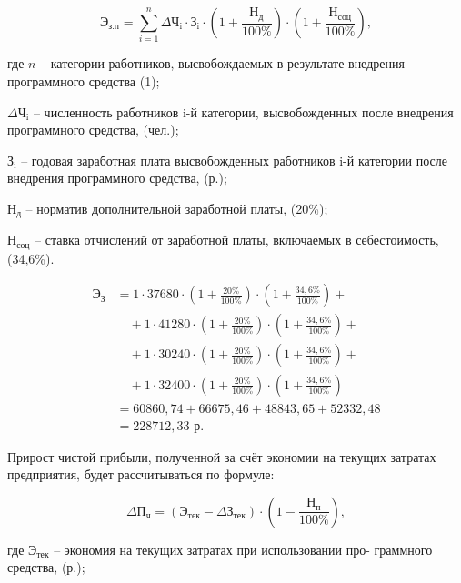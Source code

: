 \begin{equation}
    \text{Э}_{\text{з.п}} = \sum_{i=1}^{n}{\text{$\Delta$Ч}_{\text{i}}\cdot \text{З}_{\text{i}}\cdot  (1+\frac{\text{Н}_{\text{д}}}{100\%})\cdot (1+\frac{\text{Н}_{\text{соц}}}{100\%})}, 
\end{equation}

где $n$ -- категории работников, высвобождаемых в результате внедрения
программного средства (1);

    $\text{$\Delta$Ч}_{\text{i}}$ -- численность работников i-й категории, высвобожденных после
внедрения программного средства, (чел.); 
    
    $\text{З}_{\text{i}}$ -- годовая заработная плата высвобожденных работников i-й категории после внедрения программного средства, (р.);
    
    $\text{Н}_{\text{д}}$ -- норматив дополнительной заработной платы, (20\%); 
    
    $\text{Н}_{\text{соц}}$ -- ставка отчислений от заработной платы, включаемых в себестоимость, (34,6\%).
 
\begin{align*}
    \text{Э}_{\text{З}} &= 1 \cdot 37680 \cdot \left(1 + \frac{20\%}{100\%}\right) \cdot \left(1 + \frac{34,6\%}{100\%}\right) + \\
    &\quad + 1 \cdot 41280 \cdot \left(1 + \frac{20\%}{100\%}\right) \cdot \left(1 + \frac{34,6\%}{100\%}\right) + \\
    &\quad + 1 \cdot 30240 \cdot \left(1 + \frac{20\%}{100\%}\right) \cdot \left(1 + \frac{34,6\%}{100\%}\right) + \\
    &\quad + 1 \cdot 32400 \cdot \left(1 + \frac{20\%}{100\%}\right) \cdot \left(1 + \frac{34,6\%}{100\%}\right) \\
    &= 60860,74 + 66675,46 + 48843,65 + 52332,48 \\
    &= 228712,33 \text{ р}.
\end{align*}

Прирост чистой прибыли, полученной за счёт экономии на текущих затратах предприятия, будет рассчитываться по формуле:

\begin{equation}
    \text{$\Delta$П}_{\text{ч}} = (\text{Э}_{\text{тек}} - \text{$\Delta$З}_{\text{тек}})\cdot (1-\frac{\text{Н}_{\text{п}}}{100\%}), 
\end{equation}

где $\text{Э}_{\text{тек}}$ -- экономия на текущих затратах при использовании про-
граммного средства, (р.);

